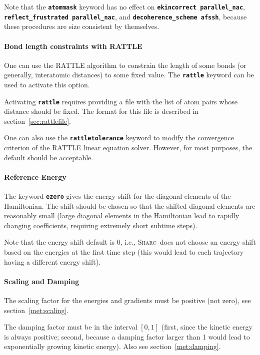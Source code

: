 \documentclass[a4paper,10pt,DIV=15,openany]{scrbook}
\newcommand{\sharc}{\textsc{Sharc}}
\newcommand{\ttt}[1]{\textbf{\texttt{#1}}}
\begin{document}
Note that the \ttt{atommask} keyword has no effect on \ttt{ekincorrect parallel\_nac}, \ttt{reflect\_frustrated parallel\_nac}, and \ttt{decoherence\_scheme afssh}, because these procedures are size consistent by themselves.

\paragraph{Bond length constraints with RATTLE}

One can use the RATTLE algorithm to constrain the length of some bonds (or generally, interatomic distances) to some fixed value.
The \ttt{rattle} keyword can be used to activate this option.

Activating \ttt{rattle} requires providing a file with the list of atom pairs whose distance should be fixed.
The format for this file is described in section~\ref{sec:rattlefile}. 

One can also use the \ttt{rattletolerance} keyword to modify the convergence criterion of the RATTLE linear equation solver.
However, for most purposes, the default should be acceptable.



\paragraph{Reference Energy}

The keyword \ttt{ezero} gives the energy shift for the diagonal elements of the Hamiltonian. The shift should be chosen so that the shifted diagonal elements are reasonably small (large diagonal elements in the Hamiltonian lead to rapidly changing coefficients, requiring extremely short subtime steps). 

Note that the energy shift default is 0, i.e., \sharc\ does not choose an energy shift based on the energies at the first time step (this would lead to each trajectory having a different energy shift).

\paragraph{Scaling and Damping}

The scaling factor for the energies and gradients must be positive (not zero), see section~\ref{met:scaling}.

The damping factor must be in the interval $[0,1]$ (first, since the kinetic energy is always positive; second, because a damping factor larger than 1 would lead to exponentially growing kinetic energy). Also see section~\ref{met:damping}.
\end{document}
